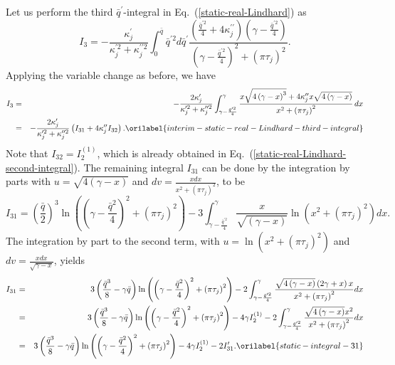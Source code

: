 \documentclass[aps,showkeys,noshowpacs,superscriptaddress,pre,preprint]{revtex4-2}
\let\label\orilabel
\begin{document}
Let us perform the third $\bar{q}^\prime$-integral in Eq.~(\ref{static-real-Lindhard}) as
\begin{equation*}
I_3 = -\frac{\kappa_j^\prime}{\kappa_j^{\prime 2} + \kappa_j^{\prime\prime 2}}
\int_0^{\bar{q}} \bar{q}^{\prime 2} d\bar{q}^\prime
\frac{
\left( \frac{\bar{q}^{\prime 2}}{4} + 4 \kappa_j^{\prime\prime} \right)
\left( \gamma - \frac{\bar{q}^{\prime 2}}{4} \right)
}{
\left( \gamma - \frac{\bar{q}^{\prime 2}}{4} \right)^2 + \left( \pi \tau_j \right)^2
} .
\end{equation*}
Applying the variable change as before,
we have
\begin{eqnarray}
I_3 &=&
- \frac{2 \kappa_j^\prime}{\kappa_j^{\prime 2} + \kappa_j^{\prime\prime 2}}
\int_{\gamma - \frac{\bar{q}^{\prime 2}}{4}}^{\gamma}
\frac{
x \sqrt{4 \left( \gamma - x \right)^3} 
+ 4 \kappa_j^{\prime\prime} x \sqrt{4 \left( \gamma - x \right)}
}{
x^2 + \left( \pi \tau_j \right)^2 
} \, dx
\nonumber \\
&=& - \frac{2 \kappa_j^\prime}{\kappa_j^{\prime 2} + \kappa_j^{\prime\prime 2}}
\left( I_{31} + 4 \kappa_j^{\prime\prime} I_{32} \right)  .
\label{interim-static-real-Lindhard-third-integral} 
\end{eqnarray}
Note that $I_{32} = I_2^{(1)}$, which is already obtained in Eq.~(\ref{static-real-Lindhard-second-integral}).
The remaining integral $I_{31}$ can be done by the integration by parts
with $u = \sqrt{4 \left( \gamma - x \right)}$ and $dv = \frac{x dx}{x^2 + \left( \pi \tau_j \right)^2}$,
to be
\begin{equation*}
I_{31} = \left( \frac{\bar{q}}{2} \right)^3 \ln\left( \left( \gamma - \frac{\bar{q}^2}{4} \right)^2 + \left( \pi \tau_j \right)^2 \right)
- 3 \int_{\gamma - \frac{\bar{q}^{\prime 2}}{4}}^{\gamma}
\frac{x}{\sqrt{\left( \gamma - x \right)}} \ln\left(x^2 + \left( \pi \tau_j \right)^2 \right) dx .
\end{equation*}
The integration by part to the second term,
with $u = \ln\left( x^2 + \left( \pi \tau_j \right)^2 \right)$ and $dv = \frac{x dx}{\sqrt{\gamma - x}}$,
yields
\begin{eqnarray}
I_{31} &=& 3 \left( \frac{\bar{q}^3}{8} - \gamma \bar{q} \right) \ln\left( \left( \gamma - \frac{\bar{q}^2}{4} \right)^2 + \left( \pi \tau_j \right)^2 \right)
- 2 \int_{\gamma - \frac{\bar{q}^{\prime 2}}{4}}^{\gamma}
\frac{ \sqrt{ 4 \left( \gamma - x \right)} \left( 2\gamma + x \right) x}{x^2 + \left( \pi \tau_j \right)^2} dx 
\nonumber \\
&=& 3 \left( \frac{\bar{q}^3}{8} - \gamma \bar{q} \right) \ln\left( \left( \gamma - \frac{\bar{q}^2}{4} \right)^2 + \left( \pi \tau_j \right)^2 \right)
- 4 \gamma I_2^{(1)} 
- 2 \int_{\gamma - \frac{\bar{q}^{\prime 2}}{4}}^{\gamma} 
\frac{ \sqrt{ 4 \left( \gamma - x \right)} x^2}{x^2 + \left( \pi \tau_j \right)^2} dx 
\nonumber \\
&=& 3 \left( \frac{\bar{q}^3}{8} - \gamma \bar{q} \right) \ln\left( \left( \gamma - \frac{\bar{q}^2}{4} \right)^2 + \left( \pi \tau_j \right)^2 \right)
- 4 \gamma I_2^{(1)} - 2 I_{31}^\prime  .
\label{static-integral-31}
\end{eqnarray}
\end{document}
